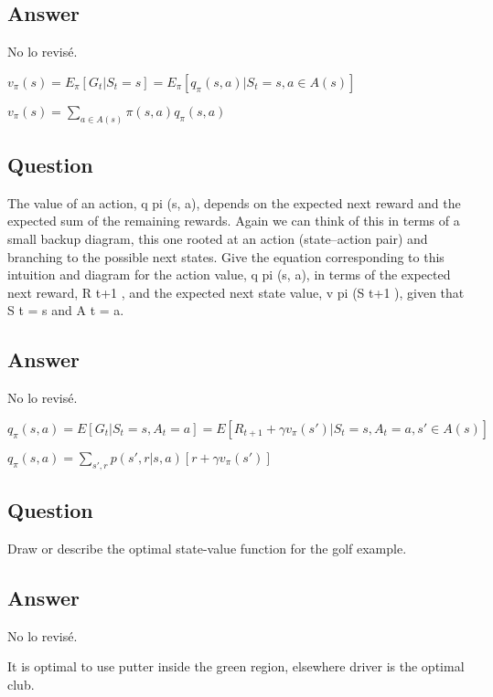 \documentclass[11pt]{article}
\def\red{\color{red}}
\begin{document}
    \subsection*{Answer} 

    {\red No lo revisé.}

    $v_{\pi}(s) = E_{\pi}[G_{t}|S_{t}=s] = E_{\pi}[q_{\pi}(s,a)|S_{t}=s, a \in A(s)] $

    $v_{\pi}(s) = \sum_{a \in A(s)} \pi(s, a) q_{\pi}(s,a) $

    \subsection{Question}

    The value of an action, q pi (s, a), depends on the expected next reward and the expected sum of the remaining rewards.
    Again we can think of this in terms of a small backup diagram, this one rooted at an action (state–action pair) and branching to the possible next states.
    Give the equation corresponding to this intuition and diagram for the action value, q pi (s, a), in terms of the expected next reward, R t+1 , and the expected next state value, v pi (S t+1 ), given that S t = s and A t = a.

    \subsection*{Answer}

    {\red No lo revisé.}

    $ q_{\pi}(s, a) = E[G_{t}|S_{t}=s, A_{t}=a] = E[R_{t+1} + \gamma v_{\pi}(s') |S_{t}=s, A_{t}=a, s' \in A(s)] $

    $ q_{\pi}(s, a) = \sum_{s',r} p(s', r | s, a) [r + \gamma v_{\pi}(s')] $

    \subsection{Question}

    Draw or describe the optimal state-value function for the golf example.

    \subsection*{Answer}
    {\red No lo revisé.}

    It is optimal to use putter inside the green region, elsewhere driver is the optimal club.
\end{document}
